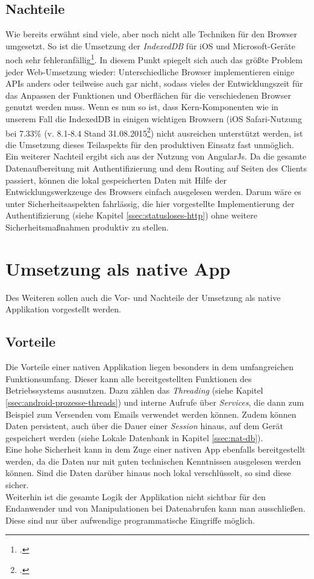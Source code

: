 \subsection{Nachteile}
\label{sec:nachteile-SPA}
Wie bereits erwähnt sind viele, aber noch nicht alle Techniken für den Browser umgesetzt. So ist die Umsetzung der \textit{IndexedDB} für iOS und Microsoft-Geräte noch sehr fehleranfällig\footcite{online:caniuse:indexedDB}. In diesem Punkt spiegelt sich auch das größte Problem jeder Web-Umsetzung wieder: Unterschiedliche Browser implementieren einige APIs anders oder teilweise auch gar nicht, sodass vieles der Entwicklungszeit für das Anpassen der Funktionen und Oberflächen für die verschiedenen Browser genutzt werden muss. Wenn es nun so ist, dass Kern-Komponenten wie in unserem Fall die IndexedDB in einigen wichtigen Browsern (iOS Safari-Nutzung bei 7.33\% (v. 8.1-8.4 Stand 31.08.2015\footcite{online:caniuse:indexedDB}) nicht ausreichen unterstützt werden, ist die Umsetzung dieses Teilaspekts für den produktiven Einsatz fast unmöglich. \\
Ein weiterer Nachteil ergibt sich aus der Nutzung von AngularJs. Da die gesamte Datenaufbereitung mit Authentifizierung und dem Routing auf Seiten des Clients passiert, können die lokal gespeicherten Daten mit Hilfe der Entwicklungswerkzeuge des Browsers einfach ausgelesen werden. Darum wäre es unter Sicherheitsaspekten fahrlässig, die hier vorgestellte Implementierung der Authentifizierung (siehe Kapitel \ref{ssec:statusloses-http}) ohne weitere Sicherheitsmaßnahmen produktiv zu stellen.

\section{Umsetzung als native App}
\label{sec:gegenueberstellung-native-app}
Des Weiteren sollen auch die Vor- und Nachteile der Umsetzung als native Applikation vorgestellt werden.

\subsection{Vorteile}
\label{sec:vorteile-native-app}
Die Vorteile einer nativen Applikation liegen besonders in dem umfangreichen Funktionsumfang. Dieser kann alle bereitgestellten Funktionen des Betriebssystems ausnutzen. Dazu zählen das \textit{Threading} (siehe Kapitel \ref{ssec:android-prozesse-threads}) und interne Aufrufe über \textit{Services}, die dann zum Beispiel zum Versenden vom Emails verwendet werden können. Zudem können Daten persistent, auch über die Dauer einer \textit{Session} hinaus, auf dem Gerät gespeichert werden (siehe Lokale Datenbank in Kapitel \ref{ssec:nat-db}).\\
Eine hohe Sicherheit kann in dem Zuge einer nativen App ebenfalls bereitgestellt werden, da die Daten nur mit guten technischen Kenntnissen ausgelesen werden können. Sind die Daten darüber hinaus noch lokal verschlüsselt, so sind diese sicher.\\
Weiterhin ist die gesamte Logik der Applikation nicht sichtbar für den Endanwender und von Manipulationen bei Datenabrufen kann man ausschließen. Diese sind nur über aufwendige programmatische Eingriffe möglich.

